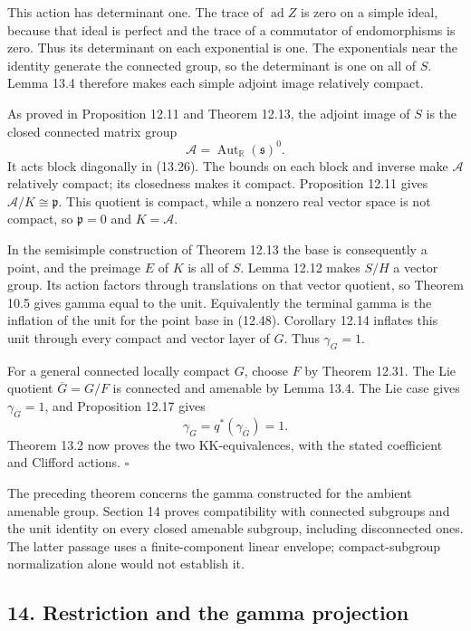 \documentclass[
  11pt,
]{article}
\begin{document}
This action has determinant one. The trace of \(\operatorname{ad}Z\) is
zero on a simple ideal, because that ideal is perfect and the trace of a
commutator of endomorphisms is zero. Thus its determinant on each
exponential is one. The exponentials near the identity generate the
connected group, so the determinant is one on all of \(S\). Lemma 13.4
therefore makes each simple adjoint image relatively compact.

As proved in Proposition 12.11 and Theorem 12.13, the adjoint image of
\(S\) is the closed connected matrix group \[
\mathcal A=\operatorname{Aut}_{\mathbb R}(\mathfrak s)^0.
\tag{13.27}
\] It acts block diagonally in (13.26). The bounds on each block and
inverse make \(\mathcal A\) relatively compact; its closedness makes it
compact. Proposition 12.11 gives \(\mathcal A/K\cong\mathfrak p\). This
quotient is compact, while a nonzero real vector space is not compact,
so \(\mathfrak p=0\) and \(K=\mathcal A\).

In the semisimple construction of Theorem 12.13 the base is consequently
a point, and the preimage \(E\) of \(K\) is all of \(S\). Lemma 12.12
makes \(S/H\) a vector group. Its action factors through translations on
that vector quotient, so Theorem 10.5 gives gamma equal to the unit.
Equivalently the terminal gamma is the inflation of the unit for the
point base in (12.48). Corollary 12.14 inflates this unit through every
compact and vector layer of \(G\). Thus \(\gamma_G=1\).

For a general connected locally compact \(G\), choose \(F\) by Theorem
12.31. The Lie quotient \(\overline G=G/F\) is connected and amenable by
Lemma 13.4. The Lie case gives \(\gamma_{\overline G}=1\), and
Proposition 12.17 gives \[
\gamma_G=q^*(\gamma_{\overline G})=1.
\tag{13.28}
\] Theorem 13.2 now proves the two KK-equivalences, with the stated
coefficient and Clifford actions. \(\square\)

The preceding theorem concerns the gamma constructed for the ambient
amenable group. Section 14 proves compatibility with connected subgroups
and the unit identity on every closed amenable subgroup, including
disconnected ones. The latter passage uses a finite-component linear
envelope; compact-subgroup normalization alone would not establish it.

\subsection{14. Restriction and the gamma
projection}\label{restriction-and-the-gamma-projection}
\end{document}
